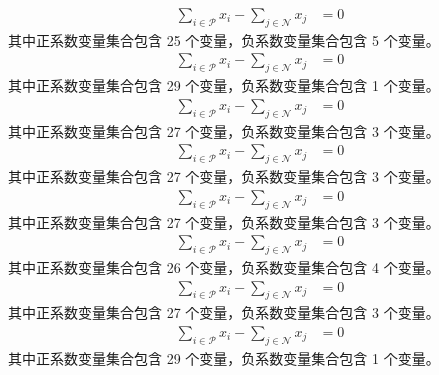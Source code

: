 \documentclass[a4paper,11pt]{article}
\begin{document}
\begin{align}
\sum_{i \in \mathcal{P}} x_i - \sum_{j \in \mathcal{N}} x_j &= 0 \nonumber
\end{align}
其中正系数变量集合包含 25 个变量，负系数变量集合包含 5 个变量。\\[0.3em]

\begin{align}
\sum_{i \in \mathcal{P}} x_i - \sum_{j \in \mathcal{N}} x_j &= 0 \nonumber
\end{align}
其中正系数变量集合包含 29 个变量，负系数变量集合包含 1 个变量。\\[0.3em]

\begin{align}
\sum_{i \in \mathcal{P}} x_i - \sum_{j \in \mathcal{N}} x_j &= 0 \nonumber
\end{align}
其中正系数变量集合包含 27 个变量，负系数变量集合包含 3 个变量。\\[0.3em]

\begin{align}
\sum_{i \in \mathcal{P}} x_i - \sum_{j \in \mathcal{N}} x_j &= 0 \nonumber
\end{align}
其中正系数变量集合包含 27 个变量，负系数变量集合包含 3 个变量。\\[0.3em]

\begin{align}
\sum_{i \in \mathcal{P}} x_i - \sum_{j \in \mathcal{N}} x_j &= 0 \nonumber
\end{align}
其中正系数变量集合包含 27 个变量，负系数变量集合包含 3 个变量。\\[0.3em]

\begin{align}
\sum_{i \in \mathcal{P}} x_i - \sum_{j \in \mathcal{N}} x_j &= 0 \nonumber
\end{align}
其中正系数变量集合包含 26 个变量，负系数变量集合包含 4 个变量。\\[0.3em]

\begin{align}
\sum_{i \in \mathcal{P}} x_i - \sum_{j \in \mathcal{N}} x_j &= 0 \nonumber
\end{align}
其中正系数变量集合包含 27 个变量，负系数变量集合包含 3 个变量。\\[0.3em]

\begin{align}
\sum_{i \in \mathcal{P}} x_i - \sum_{j \in \mathcal{N}} x_j &= 0 \nonumber
\end{align}
其中正系数变量集合包含 29 个变量，负系数变量集合包含 1 个变量。\\[0.3em]
\end{document}
